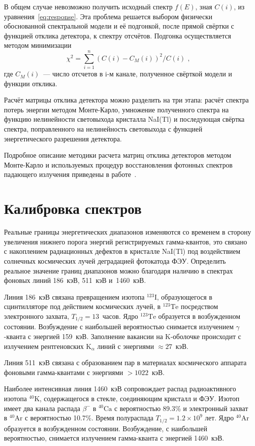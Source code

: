 В общем случае невозможно получить исходный спектр $f(E)$, зная $C(i)$, из 
уравнения~\ref{eq:response}.  Эта проблема решается выбором физически обоснованной 
спектральной модели и её подгонкой, после прямой свёртки с функцией отклика детектора, 
к спектру отсчётов. Подгонка осуществляется методом минимизации
\begin{equation}\label{eq:chisq}
    \chi^2=\sum\limits_{i=1}^n(C(i)-C_M(i))^2/C(i) \mbox{ ,}
\end{equation}
где $C_M(i)$~--- число отсчетов в i-м канале, полученное свёрткой модели и функции отклика.

Расчёт матрицы отклика детектора можно разделить на три этапа: расчёт спектра 
потерь энергии методом Монте-Карло, умножение полученного спектра на функцию 
нелинейности световыхода кристалла NaI(Tl) и последующая свёртка спектра, 
поправленного на нелинейность световыхода с функцией энергетического разрешения 
детектора.

Подробное описание методики расчета матриц отклика детекторов методом Монте-Карло 
и используемых процедур восстановления фотонных спектров падающего излучения 
приведены в работе~\citep{Terekhov_1998AIPC}.

\section{Калибровка спектров}
Реальные границы энергетических диапазонов изменяются со временем в сторону 
увеличения нижнего порога энергий регистрируемых гамма-квантов, это  
связано с накоплением радиационных дефектов в кристалле NaI(Tl) под воздействием 
солнечных космических лучей деградацией фотокатода ФЭУ. Определить реальное значение 
границ диапазонов можно благодаря наличию в спектрах фоновых линий 186~кэВ, 511~кэВ и~1460~кэВ.

Линия 186~кэВ связана превращением изотопа $^{123}\textrm{I}$, образующегося в 
сцинтилляторе под действием космических лучей, в $^{123}\textrm{Te}$ посредством 
электронного захвата, $T_{1/2}=13$~часов. Ядро $^{123}\textrm{Te}$ образуется в 
возбужденном состоянии. Возбуждение с наибольшей вероятностью снимается излучением $\gamma$-кванта 
с энергией 159~кэВ. Заполнение вакансии на K-оболочке происходит с излучением 
рентгеновских K$_{\alpha}$ линий с энергиями $\approx 27$~кэВ.

Линия 511~кэВ связана с образованием пар в материалах космического аппарата 
фоновыми гамма-квантами с энергиями $>1022$~кэВ.

Наиболее интенсивная линия 1460~кэВ сопровождает распад радиоактивного 
изотопа $^{40}\textrm{K}$, содержащегося в стекле, соединяющим кристалл и ФЭУ. 
Изотоп имеет два канала распада $\beta^{-}$ в $^{40}\textrm{Ca}$ с 
вероятностью 89.3\% и электронный захват в $^{40}\textrm{Ar}$ с вероятностью 10.7\%. 
Время полураспада $T_{1/2}=1.2\times10^9$ лет. Ядро $^{40}\textrm{Ar}$ образуется в
возбужденном состоянии. Возбуждение, с наибольшей вероятностью, снимается 
излучением гамма-кванта с энергией 1460~кэВ.

